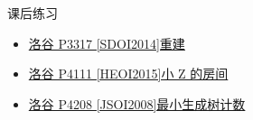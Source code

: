\begin{frame}[fragile]{课后练习}
	\begin{itemize}
		\item \href{https://www.luogu.com.cn/problem/P3317}{洛谷 P3317 [SDOI2014]重建}
		\item \href{https://www.luogu.com.cn/problem/P4111}{洛谷 P4111 [HEOI2015]小 Z 的房间}
		\item \href{https://www.luogu.com.cn/problem/P4208}{洛谷 P4208 [JSOI2008]最小生成树计数}
	\end{itemize}
\end{frame}
